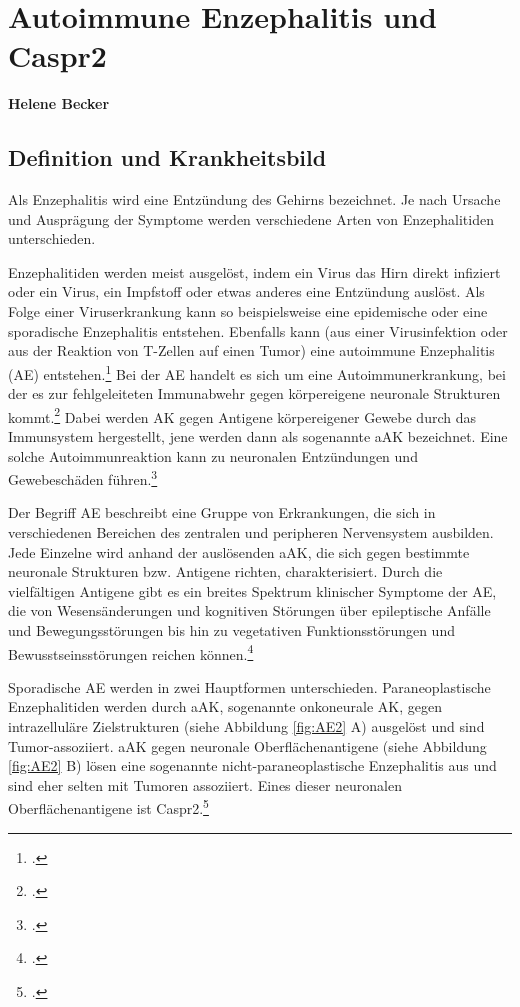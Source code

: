\chapter{Autoimmune Enzephalitis und Caspr2}
\textbf{Helene Becker}
\section{Definition und Krankheitsbild}
Als Enzephalitis wird eine Entzündung des Gehirns bezeichnet.
Je nach Ursache und Ausprägung der Symptome werden verschiedene Arten
von Enzephalitiden unterschieden.

Enzephalitiden werden meist ausgelöst, indem ein Virus das Hirn direkt
infiziert oder ein Virus, ein Impfstoff oder etwas anderes eine Entzündung
auslöst. Als Folge einer Viruserkrankung kann so beispielsweise eine
epidemische oder eine sporadische Enzephalitis entstehen. Ebenfalls kann
(aus einer Virusinfektion oder aus der Reaktion von T-Zellen auf einen Tumor) eine 
autoimmune Enzephalitis (AE) entstehen.\footcite{Klein2026}
Bei der AE handelt es sich um eine Autoimmunerkrankung, bei der es zur
fehlgeleiteten Immunabwehr gegen körpereigene neuronale Strukturen
kommt.\footcites{Klein2026}{Fernandez2026}
Dabei werden AK gegen Antigene körpereigener Gewebe durch das
Immunsystem hergestellt, jene werden dann als sogenannte aAK
bezeichnet. Eine solche Autoimmunreaktion kann zu neuronalen 
Entzündungen und Gewebeschäden führen.\footcite{Fernandez2026}

Der Begriff AE beschreibt eine Gruppe von Erkrankungen, die sich in verschiedenen Bereichen des
zentralen und peripheren Nervensystem ausbilden. Jede
Einzelne wird anhand der auslösenden aAK, die sich gegen bestimmte neuronale Strukturen bzw. 
Antigene richten, charakterisiert. Durch die vielfältigen Antigene gibt es
ein breites Spektrum klinischer Symptome der AE, die von
Wesensänderungen und kognitiven Störungen über epileptische Anfälle und
Bewegungsstörungen bis hin zu vegetativen Funktionsstörungen und Bewusstseinsstörungen
reichen können.\footcite[S.~525]{Heine2022}


Sporadische AE werden in zwei Hauptformen unterschieden. Paraneoplastische
Enzephalitiden werden durch aAK, sogenannte onkoneurale AK, gegen
intrazelluläre Zielstrukturen (siehe Abbildung \ref{fig:AE2} A) ausgelöst und sind Tumor-assoziiert. aAK gegen neuronale Oberflächenantigene (siehe Abbildung \ref{fig:AE2} B) lösen eine sogenannte
nicht-paraneoplastische Enzephalitis aus und sind eher selten mit
Tumoren assoziiert. Eines dieser neuronalen Oberflächenantigene ist
Caspr2.\footcite[S.~526--528]{Heine2022}

